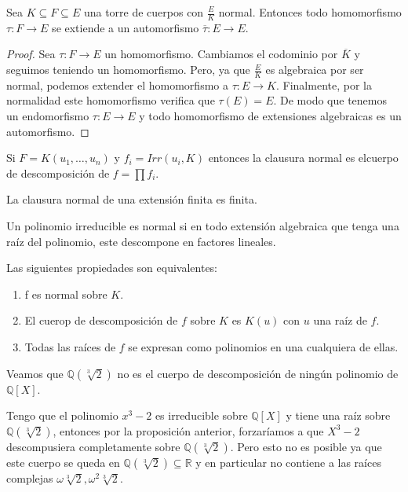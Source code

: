 \begin{theorem}
Sea $K \subseteq F \subseteq E$ una torre de cuerpos con $\frac{E}{K}$ normal. Entonces todo homomorfismo $\tau:F \to E$ se extiende a un automorfismo $\overline{\tau}:E \to E$. 
\end{theorem}
\begin{proof}
Sea $\tau:F \to E$ un homomorfismo. Cambiamos el codominio por $\overline{K}$ y seguimos teniendo un homomorfismo. Pero, ya que $\frac{E}{K}$ es algebraica por ser normal, podemos extender el homomorfismo a $\tau:E \to K$. Finalmente, por la normalidad este homomorfismo verifica que $\tau(E) = E$. De modo que tenemos un endomorfismo $\tau:E \to E$ y todo homomorfismo de extensiones algebraicas es un automorfismo.
\end{proof}

\begin{proposition}
Si $F = K(u_1,\ldots,u_n)$ y $f_i = Irr(u_i,K)$ entonces la clausura normal es elcuerpo de descomposición de $f = \prod f_i$. 
\end{proposition}

\begin{proposition}
La clausura normal de una extensión finita es finita. 
\end{proposition}

\begin{definition}
Un polinomio irreducible es normal si en todo extensión algebraica que tenga una raíz del polinomio, este descompone en factores lineales. 
\end{definition}

\begin{proposition}
Las siguientes propiedades son equivalentes:

\begin{enumerate}
\item f es normal sobre $K$.
\item El cuerop de descomposición de $f$ sobre $K$ es $K(u)$ con $u$ una raíz de $f$. 
\item Todas las raíces de $f$ se expresan como polinomios en una cualquiera de ellas. 
\end{enumerate}
\end{proposition}

\begin{example}
	Veamos que $\mathbb{Q}(\sqrt[3]{2})$ no es el cuerpo de descomposición de ningún
	polinomio de $\mathbb{Q}[X]$.
	
	Tengo que el polinomio $x^3-2$ es irreducible sobre $\mathbb{Q}[X]$ y tiene una raíz sobre $\mathbb{Q}(\sqrt[3]{2})$, entonces por la proposición anterior, forzaríamos a que $X^3-2$ descompusiera completamente sobre $\mathbb{Q}(\sqrt[3]{2})$. Pero esto no es posible ya que este cuerpo se queda en $\mathbb{Q}(\sqrt[3]{2}) \subseteq \mathbb{R}$ y en particular no contiene a las raíces complejas $\omega \sqrt[3]{2},\omega^2 \sqrt[3]{2}$.
\end{example}